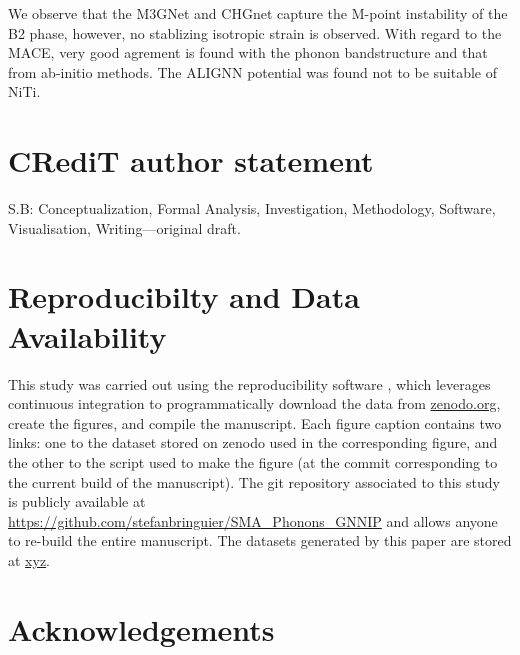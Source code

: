 \documentclass[preprint]{elsarticle}
\begin{document}
We observe that the M3GNet and CHGnet capture the M-point instability of the B2 phase, however, no stablizing isotropic strain is observed. With regard to the MACE, very good agrement is found with the phonon bandstructure and that from ab-initio methods. The ALIGNN potential was found not to be suitable of NiTi.






\section*{CR\lowercase{e}d\lowercase{i}T author statement}

S.B: Conceptualization, Formal Analysis, Investigation, Methodology, Software, Visualisation, Writing---original draft.


\section*{Reproducibilty and Data Availability}
This study was carried out using the reproducibility software \href{https://github.com/showyourwork/showyourwork}{\showyourwork} \cite{Luger2021}, which leverages continuous integration to programmatically download the data from \href{https://zenodo.org/}{zenodo.org}, create the figures, and compile the manuscript. Each figure caption contains two links: one to the dataset stored on zenodo used in the corresponding figure, and the other to the script used to make the figure (at the commit corresponding to the current build of the manuscript). The git repository associated to this study is publicly available at \url{https://github.com/stefanbringuier/SMA_Phonons_GNNIP} and allows anyone to re-build the entire manuscript. The datasets generated by this paper are stored at \url{xyz}.

\section*{Acknowledgements}

\appendix
\end{document}
